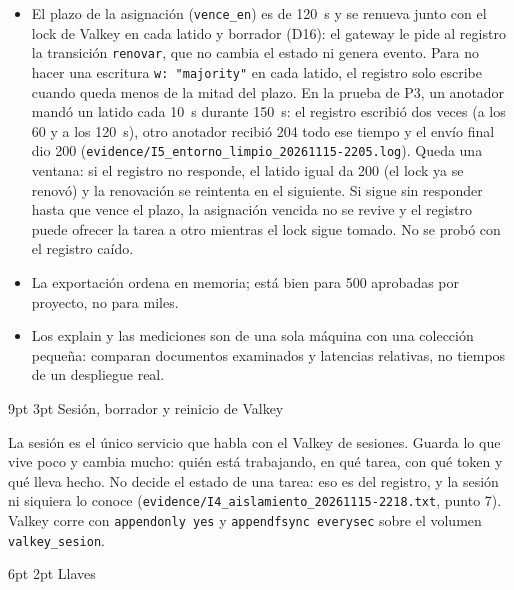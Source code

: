 \documentclass[10pt,letterpaper]{article}
\makeatletter
\newcommand{\ev}[1]{{\footnotesize\texttt{evidence/\allowbreak #1}}}
\renewcommand\section{\@startsection{section}{1}{\z@}%
  {9pt \@plus 2pt \@minus 1pt}{3pt}%
  {\normalfont\large\bfseries\color{acc}}}
\renewcommand\subsection{\@startsection{subsection}{2}{\z@}%
  {6pt \@plus 1pt}{2pt}%
  {\normalfont\normalsize\bfseries\color{acc}}}
\makeatother
\begin{document}
\begin{itemize}\setlength{\itemsep}{1pt}
\item El plazo de la asignación (\texttt{vence\_en}) es de 120~s y se renueva junto con el lock de Valkey en
cada latido y borrador (D16): el gateway le pide al registro la transición \texttt{renovar}, que no cambia el
estado ni genera evento. Para no hacer una escritura \texttt{w: "majority"} en cada latido, el registro solo
escribe cuando queda menos de la mitad del plazo. En la prueba de P3, un anotador mandó un latido cada 10~s
durante 150~s: el registro escribió dos veces (a los 60 y a los 120~s), otro anotador recibió 204 todo ese
tiempo y el envío final dio 200 (\ev{I5\_entorno\_limpio\_20261115-2205.log}). Queda una ventana: si el
registro no responde, el latido igual da 200 (el lock ya se renovó) y la renovación se reintenta en el
siguiente. Si sigue sin responder hasta que vence el plazo, la asignación vencida no se revive y el registro
puede ofrecer la tarea a otro mientras el lock sigue tomado. No se probó con el registro caído.
\item La exportación ordena en memoria; está bien para 500 aprobadas por proyecto, no para miles.
\item Los explain y las mediciones son de una sola máquina con una colección pequeña: comparan documentos
examinados y latencias relativas, no tiempos de un despliegue real.
\end{itemize}


\section{Sesión, borrador y reinicio de Valkey}

La sesión es el único servicio que habla con el Valkey de sesiones. Guarda lo que vive poco y cambia
mucho: quién está trabajando, en qué tarea, con qué token y qué lleva hecho. No decide el estado de una
tarea: eso es del registro, y la sesión ni siquiera lo conoce (\ev{I4\_aislamiento\_20261115-2218.txt},
punto 7). Valkey corre con \texttt{appendonly yes} y \texttt{appendfsync everysec} sobre el volumen
\texttt{valkey\_sesion}.

\subsection{Llaves}
\end{document}
